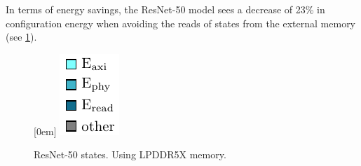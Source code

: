 In terms of energy savings, the ResNet-50 model sees a decrease of 23\% in configuration energy when avoiding the reads of states from the external memory (see \cref{fig:resnet50_states_comparison}).

\begin{figure}[hbtp]
    \centering
    \hfill
    \subcaptionbox*{}[0em]{
        \includegraphics{assets/legend.pdf}
    }
    \hfill
    \caption{ResNet-50 states. Using LPDDR5X memory.}
    \label{fig:resnet50_states_comparison}
\end{figure}
